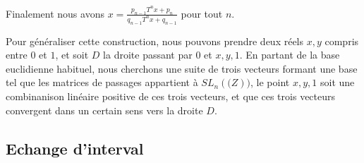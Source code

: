 Finalement nous avons $x=\frac{p_{n-1}T^n {x}+p_n}{q_{n-1}T^n x+q_{n-1}}$ pour tout $n$.

Pour généraliser cette construction, nous pouvons prendre deux réels $x,y$ compris entre $0$ et $1$, et soit $D$ la droite passant par $0$ et $x,y,1$. En partant de la base euclidienne habituel, nous cherchons une suite de trois vecteurs formant une base tel que les matrices de passages appartient à $SL_n(\mathbb(Z))$, le point $x,y,1$ soit une combinanison linéaire positive de ces trois vecteurs, et que ces trois vecteurs convergent dans un certain sens vers la droite $D$.
\subsection{Echange d'interval}
